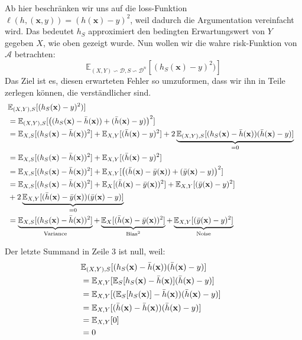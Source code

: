 Ab hier beschr\"anken wir uns auf die loss-Funktion $ \ell(h, (\mathbf{x},y)) = (h(\mathbf{x}) - y)^2 $, weil dadurch die Argumentation vereinfacht wird. 
Das bedeutet $h_S$ approximiert den bedingten Erwartungswert von 
$Y$ gegeben $X$, wie oben gezeigt wurde. Nun wollen wir die wahre risk-Funktion von $\mathcal{A}$ betrachten:
$$ \mathbb{E}_{(X, Y) \backsim \mathcal{D}, S \backsim \mathcal{D}^n}[(h_S(\mathbf{x})-y)^2)]$$
Das Ziel ist es, diesen erwarteten Fehler so umzuformen, dass wir ihn in Teile zerlegen k\"onnen, die verst\"andlicher sind. 
\begin{equation*}
  \begin{split}
    \lefteqn{ \mathbb{E}_{(X, Y), S}[(h_S(\mathbf{x})-y)^2)] } \\\
    & = \mathbb{E}_{(X, Y), S}[\bigl((h_S(\mathbf{x})-\bar{h}(\mathbf{x}))+(\bar{h}(\mathbf{x})-y)\bigr)^2] \\\
    & = \mathbb{E}_{X, S }[(h_S(\mathbf{x})- \bar{h}(\mathbf{x}))^2] + \mathbb{E}_{X, Y}[(\bar{h}(\mathbf{x})-y)^2] + 2\underbrace{\mathbb{E}_{(X, Y), S }[(h_S(\mathbf{x})-\bar{h}(\mathbf{x}))(\bar{h}(\mathbf{x})-y)]}_{=0} \\\
    & = \mathbb{E}_{X, S }[(h_S(\mathbf{x})- \bar{h}(\mathbf{x}))^2] + \mathbb{E}_{X, Y}[(\bar{h}(\mathbf{x})-y)^2] \\\
    & = \mathbb{E}_{X, S }[(h_S(\mathbf{x})- \bar{h}(\mathbf{x}))^2] + \mathbb{E}_{X, Y}[\bigl( (\bar{h}(\mathbf{x})-\bar{y}(\mathbf{x}))+(\bar{y}(\mathbf{x})-y)\bigr)^2 ] \\\
    & = \mathbb{E}_{X, S }[(h_S(\mathbf{x})- \bar{h}(\mathbf{x}))^2] + \mathbb{E}_{X}[(\bar{h}(\mathbf{x})-\bar{y}(\mathbf{x}))^2] +\mathbb{E}_{X, Y}[(\bar{y}(\mathbf{x})-y)^2] \\\
    &+ 2\underbrace{\mathbb{E}_{X, Y}[(\bar{h}(\mathbf{x})-\bar{y}(\mathbf{x}))(\bar{y}(\mathbf{x})-y)]}_{=0} \\\
    & = \underbrace{\mathbb{E}_{X, S }[(h_S(\mathbf{x})- \bar{h}(\mathbf{x}))^2]}_{\text{Variance}}+\underbrace{\mathbb{E}_{X}[(\bar{h}(\mathbf{x})-\bar{y}(\mathbf{x}))^2]}_{\text{Bias}^2} + \underbrace{\mathbb{E}_{X, Y}[(\bar{y}(\mathbf{x})-y)^2]}_{\text{Noise}}
  \end{split}
\end{equation*}

Der letzte Summand in Zeile 3 ist null, weil:
\begin{equation*}
  \begin{split}
    \lefteqn{ \mathbb{E}_{(X, Y), S }[(h_S(\mathbf{x})-\bar{h}(\mathbf{x}))(\bar{h}(\mathbf{x})-y)] } \\\
    & = \mathbb{E}_{X, Y}[\mathbb{E}_{S}[h_S(\mathbf{x})-\bar{h}(\mathbf{x})](\bar{h}(\mathbf{x})-y)] \\\
    & = \mathbb{E}_{X, Y}[(\mathbb{E}_{S}[h_S(\mathbf{x})]-\bar{h}(\mathbf{x}))(\bar{h}(\mathbf{x})-y)] \\\
    & = \mathbb{E}_{X, Y}[(\bar{h}(\mathbf{x})-\bar{h}(\mathbf{x}))(\bar{h}(\mathbf{x})-y)] \\\
    & = \mathbb{E}_{X, Y}[0]\\\
    & = 0
  \end{split}
\end{equation*}


